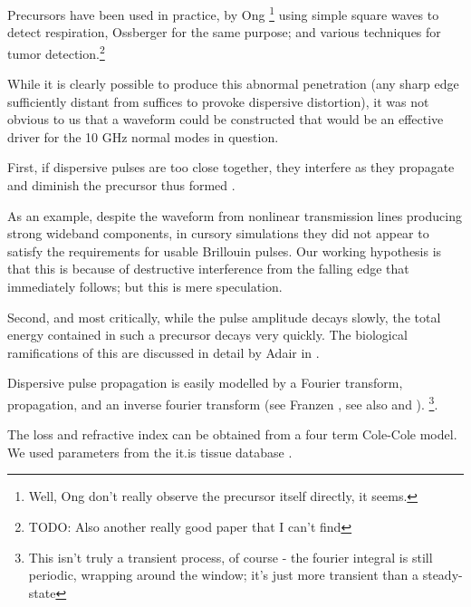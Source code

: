 \documentclass[paper.tex]{subfiles}
\begin{document}
Precursors have been used in practice, by Ong \cite{Detection2003}\footnote{Well, Ong don't really observe the precursor itself directly, it seems.} using simple square waves to detect respiration\footnotemark, Ossberger \cite{Noninvasive2004} for the same purpose; and various techniques for tumor detection.\footnote{TODO: Also another really good paper that I can't find}

While it is clearly possible to produce this abnormal penetration (any sharp edge sufficiently distant from suffices to provoke dispersive distortion), it was not obvious to us that a waveform could be constructed that would be an effective driver for the 10 GHz normal modes in question. 

First, if dispersive pulses are too close together, they interfere as they propagate and diminish the precursor thus formed \cite{Dynamical2005}.

As an example, despite the waveform from nonlinear transmission lines\cite{NLTL6275} producing strong wideband components, in cursory simulations they did not appear to satisfy the requirements for usable Brillouin pulses. Our working hypothesis is that this is because of destructive interference from the falling edge that immediately follows; but this is mere speculation.

Second, and most critically, while the pulse amplitude decays slowly, the total energy contained in such a precursor decays very quickly. The biological ramifications of this are discussed in detail by Adair in \cite{Biophysics2000}.

%

Dispersive pulse propagation is easily modelled by a Fourier transform, propagation, and an inverse fourier transform (see Franzen \cite{Wideband1999}, see also \cite{Comments1993} and \cite{Shortrisetime1989}). \footnote{This isn't truly a transient process, of course - the fourier integral is still periodic, wrapping around the window; it's just more transient than a steady-state}.

The loss and refractive index can be obtained from a four term Cole-Cole model\cite{dielectric1996}\cite{gabriel1996compilation}. We used parameters from the it.is tissue database \cite{Tissue2018a}.
\end{document}
